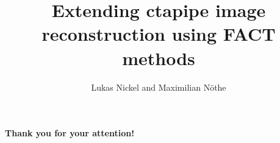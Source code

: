 \documentclass[aspectratio=1610, 9pt]{beamer}
\title{Extending ctapipe image reconstruction using FACT methods}
\author[L Nickel/M.~Nöthe]{Lukas Nickel and Maximilian Nöthe}
\institute[{\texttt{[image: logos/e5b.pdf]}}]{E5b}
\begin{document}
\maketitle







\begin{frame}
    \centering
    {\Huge \textbf{Thank you for your attention!}}
\end{frame}

\appendix
\printbibliography
\end{document}
